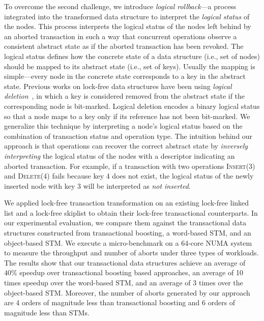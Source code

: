 \documentclass{sig-alternate-05-2015}
\begin{document}
To overcome the second challenge, we introduce \emph{logical rollback}---a process integrated into the transformed data structure to interpret the \emph{logical status} of the nodes.
This process interprets the logical status of the nodes left behind by an aborted transaction in such a way that concurrent operations observe a consistent abstract state as if the aborted transaction has been revoked.
The logical status defines how the concrete state of a data structure (i.e., set of nodes) should be mapped to its abstract state (i.e., set of keys).
Usually the mapping is simple---every node in the concrete state corresponds to a key in the abstract state.
Previous works on lock-free data structures have been using \emph{logical deletion}~\cite{harris2001pragmatic}, in which a key is considered removed from the abstract state if the corresponding node is bit-marked.
Logical deletion encodes a binary logical status so that a node maps to a key only if its reference has not been bit-marked.
We generalize this technique by interpreting a node's logical status based on the combination of transaction status and operation type.
The intuition behind our approach is that operations can recover the correct abstract state by \emph{inversely interpreting} the logical status of the nodes with a descriptor indicating an aborted transaction.
For example, if a transaction with two operations \textsc{Insert(3)} and \textsc{Delete(4)} fails because key 4 does not exist, the logical status of the newly inserted node with key 3 will be interpreted as \emph{not inserted}.

We applied lock-free transaction transformation on an existing lock-free linked list and a lock-free skiplist to obtain their lock-free transactional counterparts.
In our experimental evaluation, we compare them against the transactional data structures constructed from transactional boosting, a word-based STM, and an object-based STM.
We execute a micro-benchmark on a 64-core NUMA system to measure the throughput and number of aborts under three types of workloads.
The results show that our transactional data structures achieve an average of $40\%$ speedup over transactional boosting based approaches, an average of 10 times speedup over the word-based STM, and an average of 3 times over the object-based STM.
Moreover, the number of aborts generated by our approach are 4 orders of magnitude less than transactional boosting and 6 orders of magnitude less than STMs.
\end{document}
